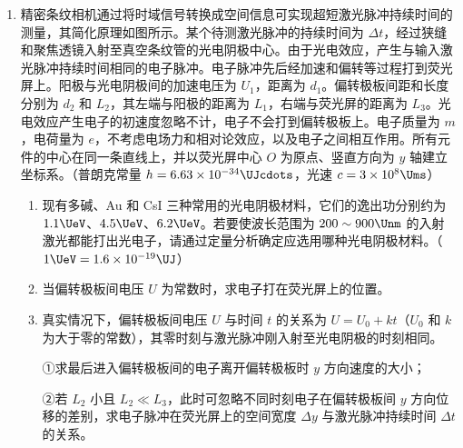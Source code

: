 \documentclass[\gkver]{gaokaozhenti}
\begin{document}
\begin{enumerate}
{解得 $t_{A} = \frac{\pi}{2}\sqrt{\frac{m}{k}}$

小球 B 碰撞后开始在直杆 OM 上做匀减速运动，加速度为 $\mu g$，设小球 B 速度减为 0 所经历的时间为 $t_{B}$，则 $t_{B} = \frac{v_{B}'}{\mu g} = \frac{1}{\mu}\sqrt{\frac{2m}{k}}$

因 $t_{B} > t_{A}$，则小球 A 在碰撞后第一次速度为零时，小球 B 与 O 点的距离为 $s$，则有

$s = v_{B}'t_{A} - \frac{1}{2}\mu gt_{A}^{2}$

联立解得 $s = \left(\frac{\sqrt{2}}{2}\pi - \frac{\sqrt{3}}{24}\pi^{2}\right)\frac{mg}{k}$
}

\item
精密条纹相机通过将时域信号转换成空间信息可实现超短激光脉冲持续时间的测量，其简化原理如图所示。某个待测激光脉冲的持续时间为 $\Delta t$，经过狭缝和聚焦透镜入射至真空条纹管的光电阴极中心。由于光电效应，产生与输入激光脉冲持续时间相同的电子脉冲。电子脉冲先后经加速和偏转等过程打到荧光屏上。阳极与光电阴极间的加速电压为 $U_{1}$，距离为 $d_{1}$。偏转极板间距和长度分别为 $d_{2}$ 和 $L_{2}$，其左端与阳极的距离为 $L_{1}$，右端与荧光屏的距离为 $L_{3}$。光电效应产生电子的初速度忽略不计，电子不会打到偏转极板上。电子质量为 $m$，电荷量为 $e$，不考虑电场力和相对论效应，以及电子之间相互作用。所有元件的中心在同一条直线上，并以荧光屏中心 $O$ 为原点、竖直方向为 $y$ 轴建立坐标系。（普朗克常量 $h = 6.63 \times 10^{-34} \UJcdots$，光速 $c = 3 \times 10^{8} \Ums$）

\begin{enumerate}
\item
现有多碱、Au 和 CsI 三种常用的光电阴极材料，它们的逸出功分别约为 $1.1 \UeV$、$4.5 \UeV$、$6.2 \UeV$。若要使波长范围为 $200 \sim 900 \Unm$ 的入射激光都能打出光电子，请通过定量分析确定应选用哪种光电阴极材料。（$1 \UeV = 1.6 \times 10^{-19} \UJ$）
\item
当偏转极板间电压 $U$ 为常数时，求电子打在荧光屏上的位置。
\item
真实情况下，偏转极板间电压 $U$ 与时间 $t$ 的关系为 $U = U_{0} + kt$（$U_{0}$ 和 $k$ 为大于零的常数），其零时刻与激光脉冲刚入射至光电阴极的时刻相同。

①求最后进入偏转极板间的电子离开偏转极板时 $y$ 方向速度的大小；

②若 $L_{2}$ 小且 $L_{2} \ll L_{3}$，此时可忽略不同时刻电子在偏转极板间 $y$ 方向位移的差别，求电子脉冲在荧光屏上的空间宽度 $\Delta y$ 与激光脉冲持续时间 $\Delta t$ 的关系。
\end{enumerate}


\end{enumerate}
\end{document}
